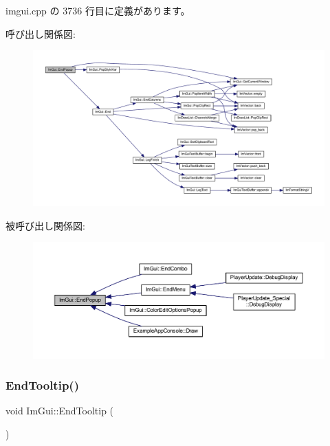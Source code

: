  imgui.\+cpp の 3736 行目に定義があります。

呼び出し関係図\+:\nopagebreak
\begin{figure}[H]
\begin{center}
\leavevmode
\includegraphics[width=350pt]{namespace_im_gui_aa6a9b5696f2ea7eed7683425fc77b8f2_cgraph}
\end{center}
\end{figure}
被呼び出し関係図\+:\nopagebreak
\begin{figure}[H]
\begin{center}
\leavevmode
\includegraphics[width=350pt]{namespace_im_gui_aa6a9b5696f2ea7eed7683425fc77b8f2_icgraph}
\end{center}
\end{figure}
\mbox{\label{namespace_im_gui_ac8d75c160cfdf43d512f773ca133a1c6}} 
\subsubsection{\texorpdfstring{End\+Tooltip()}{EndTooltip()}}
{\footnotesize\ttfamily void Im\+Gui\+::\+End\+Tooltip (\begin{DoxyParamCaption}{ }\end{DoxyParamCaption})}



